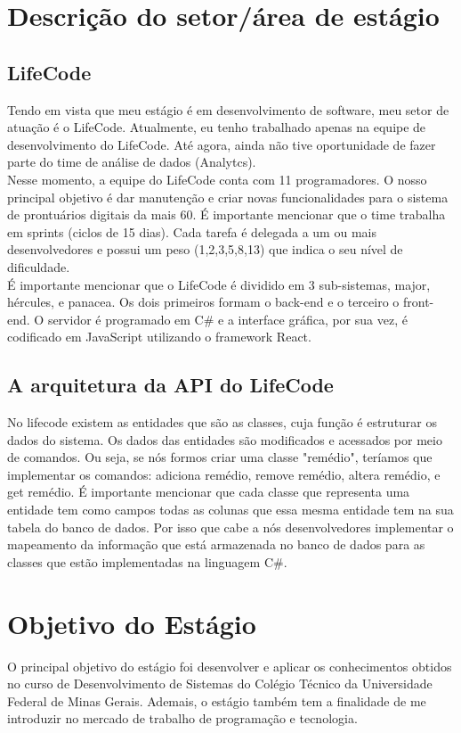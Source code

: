 \documentclass[12pt]{article}
\begin{document}
\section{Descrição do setor/área de estágio}

\subsection{LifeCode}
Tendo em vista que meu estágio é em desenvolvimento de software, meu setor de atuação é o LifeCode. Atualmente, eu tenho trabalhado apenas na equipe de desenvolvimento do LifeCode. Até agora, ainda não tive oportunidade de fazer parte do time de análise de dados (Analytcs).
\\
Nesse momento, a equipe do LifeCode conta com 11 programadores. O nosso principal objetivo é dar manutenção e criar novas funcionalidades para o sistema de prontuários digitais da mais 60. É importante mencionar que o time trabalha em sprints (ciclos de 15 dias). Cada tarefa é delegada a um ou mais desenvolvedores e possui um peso (1,2,3,5,8,13) que indica o seu nível de dificuldade.
\\
É importante mencionar que o LifeCode é dividido em 3 sub-sistemas, major, hércules, e panacea. Os dois primeiros formam o back-end e o terceiro o front-end. O servidor é programado em C\# e a interface gráfica, por sua vez, é codificado em JavaScript utilizando o framework React. 

\subsection{A arquitetura da API do LifeCode}
No lifecode existem as entidades que são as classes, cuja função é estruturar os dados do sistema. Os dados das entidades são modificados e acessados por meio de comandos. Ou seja, se nós formos criar uma classe "remédio", teríamos que implementar os comandos: adiciona remédio, remove remédio, altera remédio, e get remédio.
É importante mencionar que cada classe que representa uma entidade tem como campos todas as colunas que essa mesma entidade tem na sua tabela do banco de dados. Por isso que cabe a nós desenvolvedores implementar o mapeamento da informação que está armazenada no banco de dados para as classes que estão implementadas na linguagem C\#.


\section{Objetivo do Estágio}
O principal objetivo do estágio foi desenvolver e aplicar os conhecimentos obtidos no curso de Desenvolvimento de Sistemas do Colégio Técnico da Universidade Federal de Minas Gerais. Ademais, o estágio também tem a finalidade de me introduzir no mercado de trabalho de programação e tecnologia.
\end{document}
